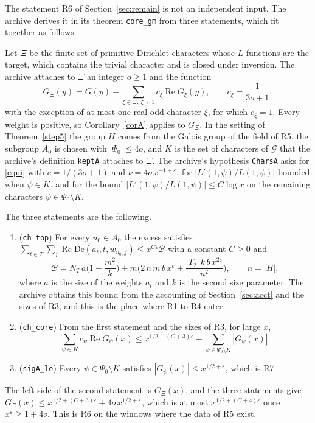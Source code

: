 \documentclass[11pt,letterpaper]{article}
\numberwithin{equation}{section}
\begin{document}
The statement R6 of Section~\ref{sec:remain} is not an independent input. The archive derives it in its theorem \texttt{core\_gm} from three statements, which fit together as follows.

Let $\Xi$ be the finite set of primitive Dirichlet characters whose $L$-functions are the target, which contains the trivial character and is closed under inversion. The archive attaches to $\Xi$ an integer $o\ge1$ and the function
\begin{equation}\label{GXi}
G_\Xi(y)=G(y)+\sum_{\xi\in\Xi,\ \xi\ne1}c_\xi\operatorname{Re}G_\xi(y),\qquad c_\xi=\frac1{3o+1},
\end{equation}
with the exception of at most one real odd character $\xi$, for which $c_\xi=1$. Every weight is positive, so Corollary~\ref{corA} applies to $G_\Xi$. In the setting of Theorem~\ref{step5} the group $H$ comes from the Galois group of the field of R5, the subgroup $A_0$ is chosen with $|\Psi_0|\le4o$, and $K$ is the set of characters of $\mathcal G$ that the archive's definition \texttt{keptA} attaches to $\Xi$. The archive's hypothesis \texttt{CharsA} asks for \eqref{equi} with $c=1/(3o+1)$ and $\nu=4o\,x^{-1+\varepsilon}$, for $|L'(1,\psi)/L(1,\psi)|$ bounded when $\psi\in K$, and for the bound $|L'(1,\psi)/L(1,\psi)|\le C\log x$ on the remaining characters $\psi\in\Psi_0\setminus K$.

The three statements are the following.
\begin{enumerate}
\item (\texttt{ch\_top}) For every $u_0\in A_0$ the excess satisfies $\sum_{t\in T}\sum_{j}\operatorname{Re}\mathrm{De}(a_t,t,w_{u_0,j})\le x^{C\varepsilon}\mathcal B$ with a constant $C\ge0$ and
\[
\mathcal B=N_T\,a\Big(1+\frac{m^2}k\Big)+m\Big(2\,n\,m\,b\,x^{\varepsilon}+\frac{|T_2|\,k\,b\,x^{2\varepsilon}}{n^2}\Big),\qquad n=|H|,
\]
where $a$ is the size of the weights $a_t$ and $k$ is the second size parameter. The archive obtains this bound from the accounting of Section~\ref{sec:acct} and the sizes of R3, and this is the place where R1 to R4 enter.
\item (\texttt{ch\_core}) From the first statement and the sizes of R3, for large $x$,
\[
\sum_{\psi\in K}c_\psi\operatorname{Re}G_\psi(x)\le x^{1/2+(C+3)\varepsilon}+\sum_{\psi\in\Psi_0\setminus K}|G_\psi(x)| .
\]
\item (\texttt{sigA\_le}) Every $\psi\in\Psi_0\setminus K$ satisfies $|G_\psi(x)|\le x^{1/2+\varepsilon}$, which is R7.
\end{enumerate}
The left side of the second statement is $G_\Xi(x)$, and the three statements give $G_\Xi(x)\le x^{1/2+(C+3)\varepsilon}+4o\,x^{1/2+\varepsilon}$, which is at most $x^{1/2+(C+4)\varepsilon}$ once $x^{\varepsilon}\ge1+4o$. This is R6 on the windows where the data of R5 exist.
\end{document}
